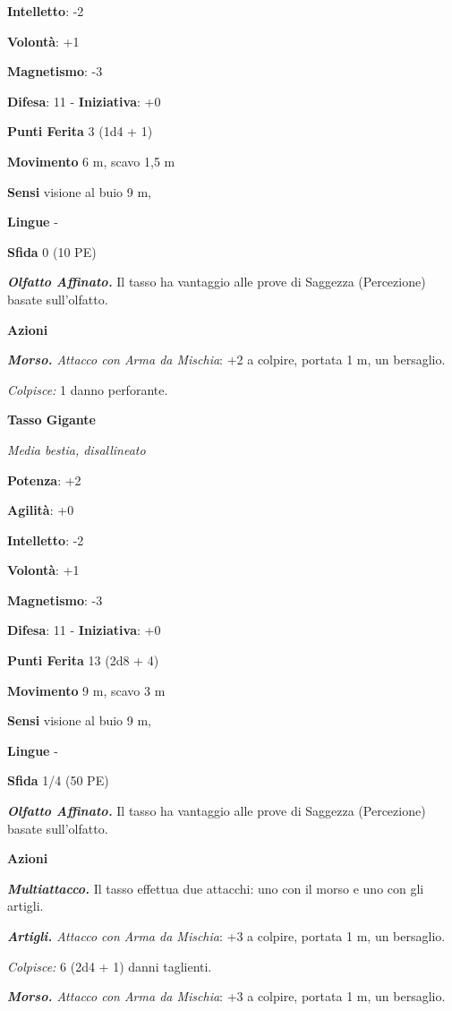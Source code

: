 \begin{multicols}{2}
\textbf{Intelletto}: -2

\textbf{Volontà}: +1

\textbf{Magnetismo}: -3

\textbf{Difesa}: 11 - \textbf{Iniziativa}: +0

\textbf{Punti Ferita} 3 (1d4 + 1)

\textbf{Movimento} 6 m, scavo 1,5 m

\textbf{Sensi} visione al buio 9 m, 

\textbf{Lingue} -

\textbf{Sfida} 0 (10 PE)\smallskip

\emph{\textbf{Olfatto Affinato.}} Il tasso ha vantaggio alle prove di
Saggezza (Percezione) basate sull'olfatto.

\smallskip\textbf{Azioni}

\emph{\textbf{Morso.} Attacco con Arma da Mischia}: +2 a colpire,
portata 1 m, un bersaglio.

\emph{Colpisce:} 1 danno perforante.

\textbf{Tasso Gigante}

\emph{Media bestia, disallineato}

\textbf{Potenza}: +2

\textbf{Agilità}: +0

\textbf{Intelletto}: -2

\textbf{Volontà}: +1

\textbf{Magnetismo}: -3

\textbf{Difesa}: 11 - \textbf{Iniziativa}: +0

\textbf{Punti Ferita} 13 (2d8 + 4)

\textbf{Movimento} 9 m, scavo 3 m

\textbf{Sensi} visione al buio 9 m, 

\textbf{Lingue} -

\textbf{Sfida} 1/4 (50 PE)\smallskip

\emph{\textbf{Olfatto Affinato.}} Il tasso ha vantaggio alle prove di
Saggezza (Percezione) basate sull'olfatto.

\smallskip\textbf{Azioni}

\emph{\textbf{Multiattacco.}} Il tasso effettua due attacchi: uno con il
morso e uno con gli artigli.

\emph{\textbf{Artigli.} Attacco con Arma da Mischia}: +3 a colpire,
portata 1 m, un bersaglio.

\emph{Colpisce:} 6 (2d4 + 1) danni taglienti.

\emph{\textbf{Morso.} Attacco con Arma da Mischia}: +3 a colpire,
portata 1 m, un bersaglio.


\end{multicols}
